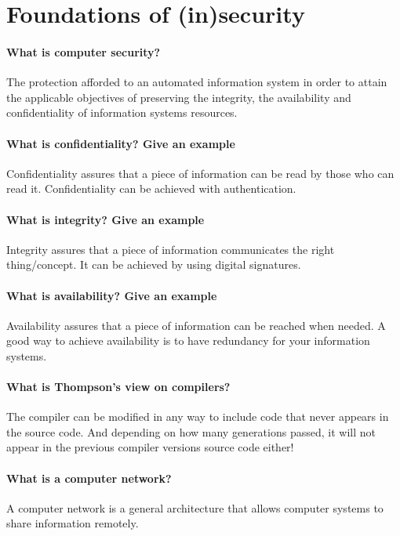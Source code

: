 \section{Foundations of (in)security}
\paragraph{What is computer security?}
The protection afforded to an automated information system in order to attain the applicable objectives of preserving the integrity, the availability and confidentiality of information systems resources.

\paragraph{What is confidentiality? Give an example}
Confidentiality assures that a piece of information can be read by those who can read it. Confidentiality can be achieved with authentication.
	
\paragraph{What is integrity? Give an example}
Integrity assures that a piece of information communicates the right thing/concept. It can be achieved by using digital signatures.
	
\paragraph{What is availability? Give an example}
Availability assures that a piece of information can be reached when needed. A good way to achieve availability is to have redundancy for your information systems.
	
\paragraph{What is Thompson's view on compilers?}
The compiler can be modified in any way to include code that never appears in the source code. And depending on how many generations passed, it will not appear in the previous compiler versions source code either!
	
\paragraph{What is a computer network?}
A computer network is a general architecture that allows computer systems to share information remotely.

